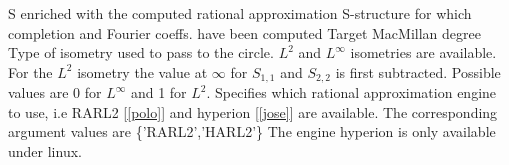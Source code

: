 %
%
%
%
%
%
%
%
{\fitem[SS] S enriched with the computed rational approximation}
{\fitem[S] S-structure for which completion and Fourier coeffs. have
  been computed
\fitem[n] Target MacMillan degree
\fitem[Is\_type=DVC.RA.divide\_by\_z\_minus\_one] Type of isometry used to pass to the circle. $L^2$ and
  $L^{\infty}$ isometries are available. For the $L^2$ isometry the
  value at $\infty$ for $S_{1,1}$ and $S_{2,2}$ is first
  subtracted. Possible values are 0 for $L^{\infty}$ and 1 for $L^2$.
\fitem[solver=DVC.RA.solver\_flag] Specifies which rational approximation engine to
use, i.e RARL2 [\ref{polo}] and hyperion [\ref{jose}] are available. The
corresponding argument values are \{'RARL2','HARL2'\}
}  
{}
{ The engine hyperion is only available under linux. }
 
